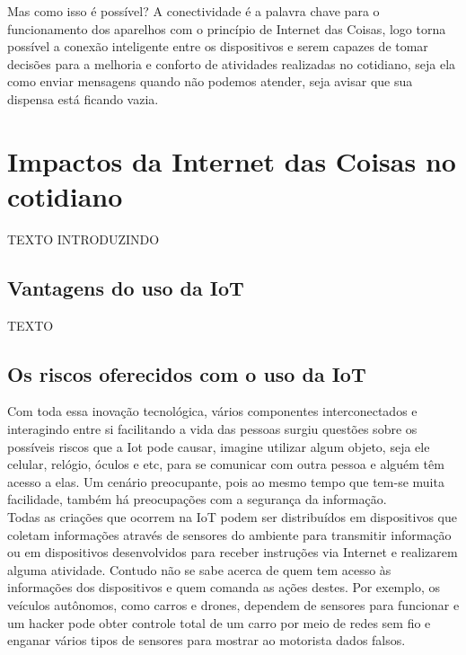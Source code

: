 \documentclass[11pt]{classe_cn}                 %
\begin{document}
Mas como isso é possível? A conectividade é a palavra chave para o 
funcionamento dos aparelhos com o princípio de Internet das Coisas, 
logo torna possível a conexão inteligente entre os dispositivos e 
serem capazes de tomar decisões para a melhoria e conforto de 
atividades realizadas no cotidiano, seja ela como enviar mensagens 
quando não podemos atender, seja avisar que sua dispensa está ficando vazia.

\section{Impactos da Internet das Coisas no cotidiano}
TEXTO INTRODUZINDO

\subsection{Vantagens do uso da IoT}
TEXTO

\subsection{Os riscos oferecidos com o uso da IoT}
Com toda essa inovação tecnológica, vários componentes interconectados 
e interagindo entre si facilitando a vida das pessoas surgiu questões 
sobre os possíveis riscos que a Iot pode causar, imagine utilizar algum 
objeto, seja ele celular, relógio, óculos e etc, para se comunicar com 
outra pessoa e alguém têm acesso a elas. Um  cenário preocupante, pois 
ao mesmo tempo que tem-se muita facilidade, também há preocupações com 
a segurança da informação.\\

Todas as criações que ocorrem na IoT podem ser distribuídos em 
dispositivos que coletam informações através de sensores do ambiente 
para transmitir informação ou em dispositivos desenvolvidos para receber
instruções via Internet e realizarem alguma atividade. Contudo não 
se sabe acerca de quem tem acesso às informações dos dispositivos e 
quem comanda as ações destes. Por exemplo, os veículos autônomos, como 
carros e drones, dependem de sensores para funcionar e um hacker pode 
obter controle total de um carro por meio de redes sem fio e enganar 
vários tipos de sensores para mostrar ao motorista dados falsos.\\
\end{document}
